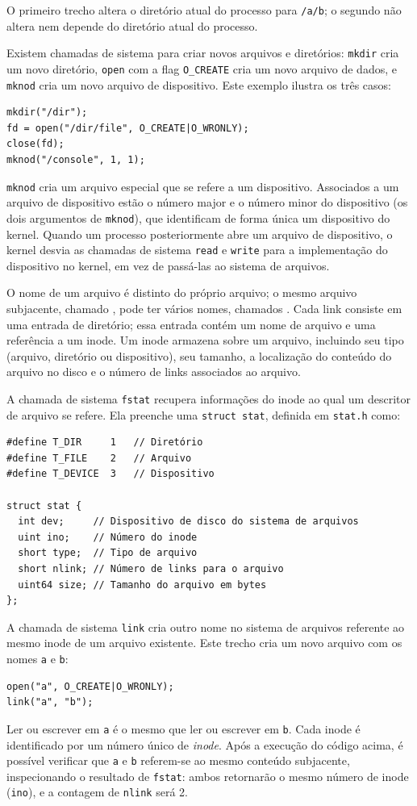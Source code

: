 O primeiro trecho altera o diretório atual do processo para
\lstinline{/a/b};
o segundo não altera nem depende do diretório atual do processo.

Existem chamadas de sistema para criar novos arquivos e diretórios:
\lstinline{mkdir}
cria um novo diretório,
\lstinline{open}
com a flag
\lstinline{O_CREATE}
cria um novo arquivo de dados,
e
\lstinline{mknod}
cria um novo arquivo de dispositivo.
Este exemplo ilustra os três casos:
\begin{lstlisting}[]
mkdir("/dir");
fd = open("/dir/file", O_CREATE|O_WRONLY);
close(fd);
mknod("/console", 1, 1);
\end{lstlisting}

\lstinline{mknod}
cria um arquivo especial que se refere a um dispositivo.
Associados a um arquivo de dispositivo estão
o número major e o número minor do dispositivo
(os dois argumentos de
\lstinline{mknod}),
que identificam de forma única um dispositivo do kernel.
Quando um processo posteriormente abre um arquivo de dispositivo, o kernel
desvia as chamadas de sistema
\lstinline{read}
e
\lstinline{write}
para a implementação do dispositivo no kernel,
em vez de passá-las ao sistema de arquivos.

O nome de um arquivo é distinto do próprio arquivo;
o mesmo arquivo subjacente, chamado
,
pode ter vários nomes,
chamados
.
Cada link consiste em uma entrada de diretório;
essa entrada contém um nome de arquivo e uma referência
a um inode.
Um inode armazena
sobre um arquivo, incluindo
seu tipo (arquivo, diretório ou dispositivo),
seu tamanho,
a localização do conteúdo do arquivo no disco
e o número de links associados ao arquivo.

A chamada de sistema
\lstinline{fstat}
recupera informações do inode ao qual um
descritor de arquivo se refere.
Ela preenche uma
\lstinline{struct stat},
definida em
\lstinline{stat.h} 
como:
\begin{lstlisting}[]
#define T_DIR     1   // Diretório
#define T_FILE    2   // Arquivo
#define T_DEVICE  3   // Dispositivo

struct stat {
  int dev;     // Dispositivo de disco do sistema de arquivos
  uint ino;    // Número do inode
  short type;  // Tipo de arquivo
  short nlink; // Número de links para o arquivo
  uint64 size; // Tamanho do arquivo em bytes
};
\end{lstlisting}

A chamada de sistema
\lstinline{link}
cria outro nome no sistema de arquivos
referente ao mesmo inode de um arquivo existente.
Este trecho cria um novo arquivo com os nomes
\lstinline{a}
e
\lstinline{b}:
\begin{lstlisting}[]
open("a", O_CREATE|O_WRONLY);
link("a", "b");
\end{lstlisting}
Ler ou escrever em
\lstinline{a}
é o mesmo que ler ou escrever em
\lstinline{b}.
Cada inode é identificado por um número único de
\textit{inode}.
Após a execução do código acima, é possível
verificar que
\lstinline{a}
e
\lstinline{b}
referem-se ao mesmo conteúdo subjacente, inspecionando o resultado de
\lstinline{fstat}:
ambos retornarão o mesmo número de inode
(\lstinline{ino}),
e a contagem de
\lstinline{nlink}
será 2.

